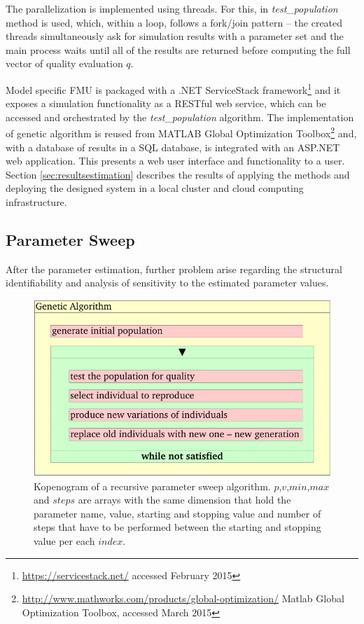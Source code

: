 The parallelization is implemented using threads. For this, in \emph{test\_population} method is used, which, within a loop, follows a fork/join pattern -- the created threads simultaneously ask for simulation results with a parameter set and the main process waits until all of the results are returned before computing the full vector of quality evaluation $q$.

Model specific FMU is packaged with a .NET ServiceStack framework\footnote{\url{https://servicestack.net/} accessed February 2015} and it exposes a simulation functionality as a RESTful web service, which can be accessed and orchestrated by the \emph{test\_population} algorithm. The implementation of genetic algorithm is reused from MATLAB \texttrademark Global Optimization Toolbox\footnote{\url{http://www.mathworks.com/products/global-optimization/} Matlab Global Optimization Toolbox, accessed March 2015} and, with a database of results in a SQL database, is integrated with an ASP.NET web application. This presents a web user interface and functionality to a user. Section \ref{sec:resultsestimation} describes the results of applying the methods and deploying the designed system in a local cluster and cloud computing infrastructure.

\subsection{Parameter Sweep}
\label{sec:sensitivity}
After the parameter estimation, further problem arise regarding the structural identifiability and analysis of sensitivity to the estimated parameter values\cite[p.~176]{khoo2000}. 

\begin{figure}[hbt]
    \centering
     \includegraphics[page=4]{chapter3/GA-kopenogram-crop.pdf}    
    \caption{Kopenogram of a recursive parameter sweep algorithm. $p$,$v$,$min$,$max$ and $steps$ are arrays with the same dimension that hold the parameter name, value, starting and stopping value and number of steps that have to be performed between the starting and stopping value per each $index$.    
    }
    \label{fig:paramsweep}
\end{figure}

